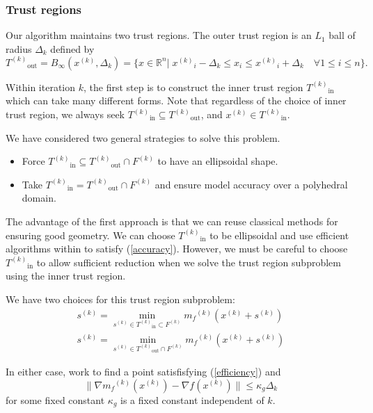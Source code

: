 \documentclass{article}
\theoremstyle{case}
\newcommand{\modelk}{{{m}_f}^{(k)}}
\newcommand{\iteratek}{{x}^{(k)}}
\newcommand{\trialk}{{s}^{(k)}}
\newcommand{\innertrk}{{T^{(k)}}_{\text{in}}}
\newcommand{\outertrk}{{T^{(k)}}_{\text{out}}}
\newcommand{\feasiblek}{{F}^{(k)}}
\let\oldref\ref
\renewcommand{\ref}[1]{(\oldref{#1})}
\begin{document}
\subsubsection{Trust regions}
Our algorithm maintains two trust regions.
The outer trust region is an $L_1$ ball of radius $\Delta_k$ defined by
\begin{equation}
\label{trust_region}
\outertrk = B_{\infty}(\iteratek,\Delta_k) = \{x\in \mathbb R^n | \; {\iteratek}_i - \Delta_k \le x_i \le {\iteratek}_i + \Delta_k \quad \forall 1\le i \le n\}.
\end{equation}

Within iteration $k$, the first step is to construct the inner trust region $\innertrk$ which can take many different forms.
Note that regardless of the choice of inner trust region, we always seek
$\innertrk \subseteq \outertrk $, and $\iteratek \in \innertrk$.


We have considered two general strategies to solve this problem.

\begin{itemize}
\item Force $\label{bluepill} \innertrk \subseteq \outertrk \cap \feasiblek$ to have an ellipsoidal shape.
\item Take $\label{redpill} \innertrk = \outertrk \cap \feasiblek$ and ensure model accuracy over a polyhedral domain.
\end{itemize}

The advantage of the first approach is that we can reuse classical methods for ensuring good geometry.
We can choose $\innertrk$ to be ellipsoidal and use efficient algorithms within \cite{DUMMY:intro_book} to satisfy \ref{accuracy}.
However, we must be careful to choose $\innertrk$ to allow sufficient reduction when we solve the trust region subproblem using the inner trust region.


We have two choices for this trust region subproblem:
\begin{align}
\trialk = \min_{\trialk \in \innertrk \subset \feasiblek} \modelk(\iteratek + \trialk) \\
\trialk = \min_{\trialk \in \outertrk \cap \feasiblek} \modelk(\iteratek + \trialk)
\end{align}

In either case, work to find a point satisfisfying \ref{efficiency} and 
\begin{equation}
\label{accuracy}
\|\nabla \modelk(\iteratek) - \nabla f(\iteratek) \| \le \kappa_g \Delta_k
\end{equation}
 for some fixed constant $\kappa_g$ is a fixed constant independent of $k$.
\end{document}
